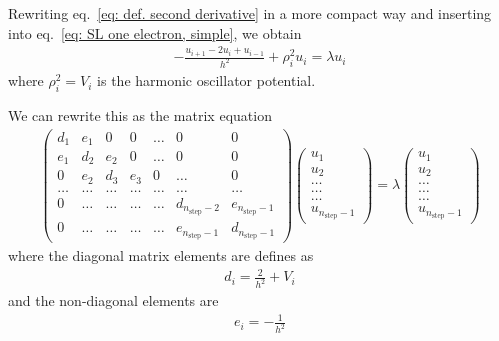 \documentclass[11pt, a4paper]{article}
\begin{document}
			Rewriting eq.~\ref{eq: def. second derivative} in a more compact way and inserting into eq.~\ref{eq: SL one electron, simple}, we obtain
			\begin{align*}
				-\frac{u_{i+1} - 2u_i + u_{i-1}}{h^2} + \rho_i^2u_i = \lambda u_i
			\end{align*}
			where $\rho_i^2=V_i$ is the harmonic oscillator potential.
			
			We can rewrite this as the matrix equation
			\begin{align}
			 	\begin{pmatrix} d_1 		& e_1 	& 0   	& 0    	& \dots  	&0     								& 0 \\
                                			e_1 		& d_2 	& e_2 	& 0    	& \dots  	&0     								&0 \\
                               	 		0   		& e_2 	& d_3 	& e_3  	&0       		&\dots 								& 0\\
                                			\dots  	& \dots 	& \dots 	& \dots	&\dots     	&\dots	 							& \dots\\
                                			0   		& \dots 	& \dots 	& \dots 	&\dots      	&d_{n_{\mathrm{step}}-2}	& e_{n_{\mathrm{step}}-1}\\
                                			0   		& \dots 	& \dots 	& \dots 	&\dots      	&e_{n_{\mathrm{step}}-1}	& d_{n_{\mathrm{step}}-1}
            		\end{pmatrix}        
            		\begin{pmatrix} 	u_{1} \\
                                            	u_{2} \\
                                          	\dots \\
                                          	\dots \\ 
                                          	\dots \\
                                            	u_{n_{\mathrm{step}}-1}
             	\end{pmatrix}
             	=\lambda
             	\begin{pmatrix} 	u_{1} \\
                                           	u_{2} \\
                                            	\dots \\ 
                                            	\dots \\ 
                                            	\dots\\
                             				u_{n_{\mathrm{step}}-1}
            		\end{pmatrix} 
      \label{eq: matrix eigenvalue equation}
      \end{align}
      where the diagonal matrix elements are defines as
		\begin{align*}
			d_i = \frac{2}{h^2} + V_i
		\end{align*}
		and the non-diagonal elements are
		\begin{align*}
			e_i = -\frac{1}{h^2}
		\end{align*}
	
\end{document}
